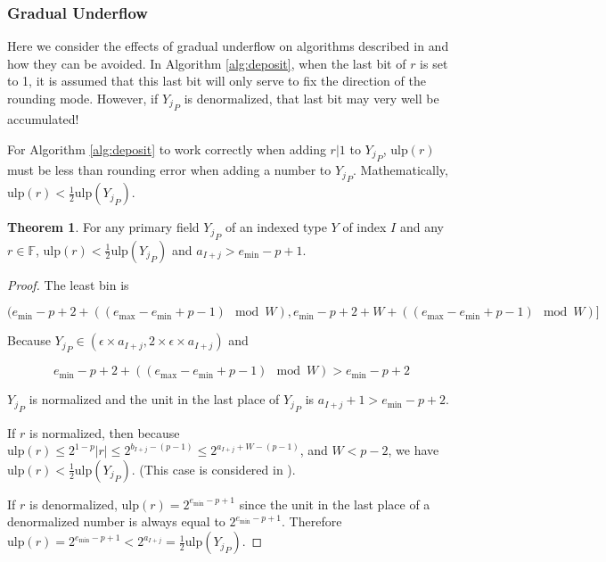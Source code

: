 \documentclass[12pt]{article}
\providecommand{\F}{\ensuremath{\mathbb{F}}}
\providecommand{\min}{\ensuremath{\text{min}}}
\providecommand{\max}{\ensuremath{\text{max}}}
\providecommand{\ulp}{\ensuremath{\text{ulp}}}
\theoremstyle{definition}
\newtheorem{thm}{Theorem}[section]
\numberwithin{equation}{section}
\begin{document}
    \subsubsection{Gradual Underflow}
      \label{sec:indexed_implementation_underflow_gradual}
      Here we consider the effects of gradual underflow on algorithms described in \cite{repsum} and how they can be avoided. In Algorithm \ref{alg:deposit}, when the last bit of $r$ is set to 1, it is assumed that this last bit will only serve to fix the direction of the rounding mode. However, if ${Y_j}_P$ is denormalized, that last bit may very well be accumulated!

      For Algorithm \ref{alg:deposit} to work correctly when adding $r | 1$ to ${Y_j}_P$, $\ulp(r)$ must be less than rounding error when adding a number to ${Y_j}_P$. Mathematically, $\ulp(r) < \frac{1}{2}\ulp({Y_j}_P)$.

      \begin{thm}
        For any primary field ${Y_j}_P$ of an indexed type $Y$ of index $I$ and any $r \in \F$, $\ulp(r) < \frac{1}{2}\ulp({Y_j}_P)$ and $a_{I + j} > e_{\min} - p + 1$.
        \label{thm:underflowulp}
      \end{thm}
      \begin{proof}
      The least bin is

      \begin{equation*}
      (e_{\min} - p + 2 + ((e_{\max} - e_{\min} + p - 1 ) \mod W), e_{\min} - p + 2 + W + ((e_{\max} - e_{\min} + p - 1)\mod W)]
      \end{equation*}

      Because ${Y_j}_P \in (\epsilon \times a_{I + j}, 2 \times \epsilon \times a_{I + j})$ and

      \begin{equation*}
      e_{\min} - p + 2 + ((e_{\max} - e_{\min} + p- 1) \mod W) > e_{\min} - p + 2
      \end{equation*}

      ${Y_j}_P$ is normalized and the unit in the last place of ${Y_j}_P$ is $a_{I + j} + 1 > e_{\min} - p + 2$.

      If $r$ is normalized, then because $\ulp(r) \leq 2^{1 - p}|r| \leq 2^{b_{I + j} - (p - 1)} \leq 2^{a_{I + j} + W - (p - 1)}$, and $W < p - 2$, we have $\ulp(r) < \frac{1}{2}\ulp({Y_j}_P)$. (This case is considered in \cite{repsum}).

      If $r$ is denormalized, $\ulp(r) = 2^{e_{\min} - p + 1}$ since the unit in the last place of a denormalized number is always equal to $2^{e_{\min} - p + 1}$. Therefore $\ulp(r) = 2^{e_{\min} - p + 1} < 2^{a_{I + j}} = \frac{1}{2}\ulp({Y_j}_P)$.
      \end{proof}
\end{document}
